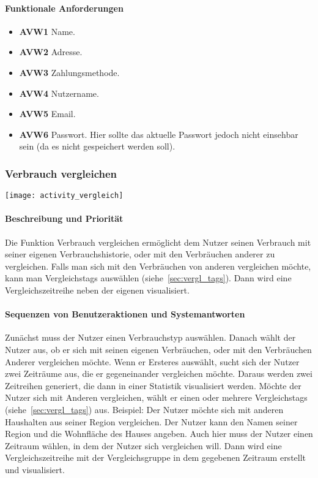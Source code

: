 \paragraph{Funktionale Anforderungen}
\begin{itemize}
	\item \textbf{AVW1} Name.
	\item \textbf{AVW2} Adresse.
	\item \textbf{AVW3} Zahlungsmethode.
	\item \textbf{AVW4} Nutzername.
	\item \textbf{AVW5} Email.
	\item \textbf{AVW6} Passwort.
	      Hier sollte das aktuelle Passwort jedoch nicht einsehbar sein
	      (da es nicht gespeichert werden soll).
\end{itemize}




\subsubsection{Verbrauch vergleichen}
\texttt{[image: activity\_vergleich]}
\paragraph{Beschreibung und Priorität}
Die Funktion Verbrauch vergleichen ermöglicht dem Nutzer seinen Verbrauch mit seiner eigenen Verbrauchshistorie,
oder mit den Verbräuchen anderer zu vergleichen.
Falls man sich mit den Verbräuchen von anderen vergleichen möchte, kann man Vergleichstags auswählen
(siehe~\ref{sec:vergl_tags}).
Dann wird eine Vergleichszeitreihe neben der eigenen visualisiert.
\paragraph{Sequenzen von Benutzeraktionen und Systemantworten}
Zunächst muss der Nutzer einen Verbrauchstyp auswählen.
Danach wählt der Nutzer aus, ob er sich mit seinen eigenen Verbräuchen, oder mit den Verbräuchen Anderer vergleichen möchte.
Wenn er Ersteres auswählt, sucht sich der Nutzer zwei Zeiträume aus, die er gegeneinander vergleichen möchte.
Daraus werden zwei Zeitreihen generiert, die dann in einer Statistik visualisiert werden.
Möchte der Nutzer sich mit Anderen vergleichen, wählt er einen oder mehrere Vergleichstags (siehe~\ref{sec:vergl_tags}) aus.
Beispiel: Der Nutzer möchte sich mit anderen Haushalten aus seiner Region vergleichen.
Der Nutzer kann den Namen seiner Region und die Wohnfläche des Hauses angeben.
Auch hier muss der Nutzer einen Zeitraum wählen, in dem der Nutzer sich vergleichen will.
Dann wird eine Vergleichszeitreihe mit der Vergleichsgruppe in dem gegebenen Zeitraum erstellt und visualisiert.
